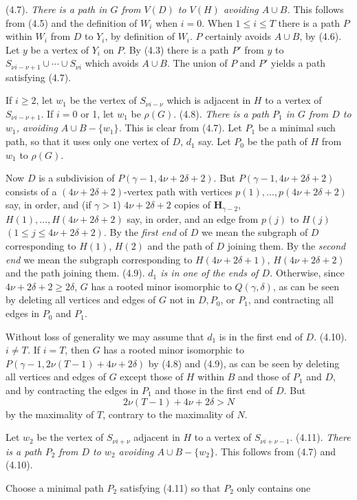 (4.7). \textit{There is a path in $G$ from $V(D)$ to $V(H)$ avoiding $A\cup B$.}
\stmt
This follows from (4.5) and the definition of $W_i$ when $i=0$. When
$1\le i\le T$ there is a path $P$ within $W_i$ from $D$ to $Y_i$, by definition of $W_i$. $P$
certainly avoids $A\cup B$, by (4.6). Let $y$ be a vertex of $Y_i$ on $P$. By (4.3) there
is a path $P'$ from $y$ to $S_{\nu i-\nu+1}\cup\cdots\cup S_{\nu i}$ which avoids $A\cup B$. The union
of $P$ and $P'$ yields a path satisfying (4.7).

If $i\ge 2$, let $w_1$ be the vertex of $S_{\nu i-\nu}$ which is adjacent in $H$ to a vertex of
$S_{\nu i-\nu+1}$. If $i=0$ or 1, let $w_1$ be $\rho(G)$.
\stmt
(4.8). \textit{There is a path $P_1$ in $G$ from $D$ to $w_1$, avoiding $A\cup B-\{w_1\}$.}
\stmt
This is clear from (4.7). Let $P_1$ be a minimal such path, so that it uses
only one vertex of $D$, $d_1$ say. Let $P_0$ be the path of $H$ from $w_1$ to $\rho(G)$.

Now $D$ is a subdivision of $P(\gamma-1, 4\nu+2\delta+2)$. But
$P(\gamma-1, 4\nu+2\delta+2)$ consists of a $(4\nu+2\delta+2)$-vertex path with vertices
$p(1),..., p(4\nu+2\delta+2)$ say, in order, and (if $\gamma>1$) $4\nu+2\delta+2$ copies of
$\mathbf{H}_{\gamma-2}$, $H(1),..., H(4\nu+2\delta+2)$ say, in order, and an edge from $p(j)$ to $H(j)$
$(1\le j\le 4\nu+2\delta+2)$. By the \textit{first end} of $D$ we mean the subgraph of $D$
corresponding to $H(1)$, $H(2)$ and the path of $D$ joining them. By the \textit{second
end} we mean the subgraph corresponding to $H(4\nu+2\delta+1)$, $H(4\nu+2\delta+2)$
and the path joining them.
\stmt
(4.9). \textit{$d_1$ is in one of the ends of $D$.}
\stmt
Otherwise, since $4\nu+2\delta+2\ge 2\delta$, $G$ has a rooted minor isomorphic to
$Q(\gamma, \delta)$, as can be seen by deleting all vertices and edges of $G$ not in $D, P_0$,
or $P_1$, and contracting all edges in $P_0$ and $P_1$.

Without loss of generality we may assume that $d_1$ is in the first end of $D$.
\stmt
(4.10). \textit{$i\ne T$.}
\stmt
If $i=T$, then $G$ has a rooted minor isomorphic to $P(\gamma-1, 2\nu(T-1)+
4\nu+2\delta)$ by (4.8) and (4.9), as can be seen by deleting all vertices and edges
of $G$ except those of $H$ within $B$ and those of $P_1$ and $D$, and by contracting
the edges in $P_1$ and those in the first end of $D$. But
\begin{equation*}
2\nu(T-1)+4\nu+2\delta>N
\end{equation*}
by the maximality of $T$, contrary to the maximality of $N$.

Let $w_2$ be the vertex of $S_{\nu i+\nu}$ adjacent in $H$ to a vertex of $S_{\nu i+\nu-1}$.
\stmt
(4.11). \textit{There is a path $P_2$ from $D$ to $w_2$ avoiding $A\cup B-\{w_2\}$.}
\stmt
This follows from (4.7) and (4.10).

Choose a minimal path $P_2$ satisfying (4.11) so that $P_2$ only contains one
